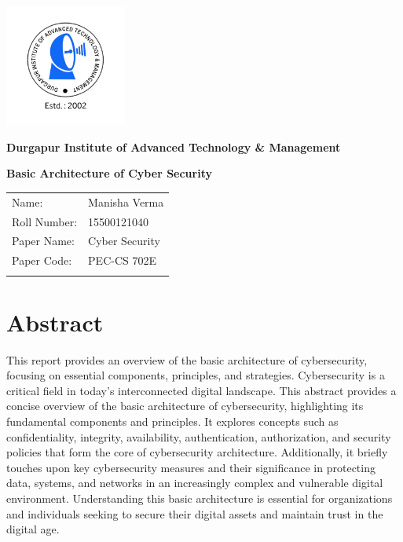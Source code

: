 \documentclass[12pt]{report}
\begin{document}
\begin{titlepage}
    \centering
    \includegraphics[width=4cm]{transparent logo.png}

    \Large \textbf{Durgapur Institute of Advanced Technology \& Management}
    \vspace{6cm}

    \Large \textbf{Basic Architecture of Cyber Security}\par
    \vspace{1cm}
    
    \large
    \begin{tabular}{l l}
        Name: & Manisha Verma \\
        Roll Number: & 15500121040 \\
        Paper Name: & Cyber Security \\
        Paper Code: & PEC-CS 702E \\ \\
    \end{tabular}
\end{titlepage}

\tableofcontents

\newpage
\section*{Abstract}
This report provides an overview of the basic architecture of cybersecurity, focusing on essential components, principles, and strategies. Cybersecurity is a critical field in today's interconnected digital landscape. This abstract provides a concise overview of the basic architecture of cybersecurity, highlighting its fundamental components and principles. It explores concepts such as confidentiality, integrity, availability, authentication, authorization, and security policies that form the core of cybersecurity architecture. Additionally, it briefly touches upon key cybersecurity measures and their significance in protecting data, systems, and networks in an increasingly complex and vulnerable digital environment. Understanding this basic architecture is essential for organizations and individuals seeking to secure their digital assets and maintain trust in the digital age.
\end{document}
